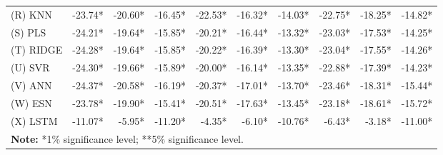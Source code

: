 {\begin{longtable}[htb!]{lrrrrrrrrr}
(R) KNN             & -23.74* & -20.60* & -16.45*  & -22.53* & -16.32* & -14.03* & -22.75* & -18.25* & -14.82* \\
(S) PLS             & -24.21* & -19.64* & -15.85*  & -20.21* & -16.44* & -13.32* & -23.03* & -17.53* & -14.25* \\
(T) RIDGE           & -24.28* & -19.64* & -15.85*  & -20.22* & -16.39* & -13.30* & -23.04* & -17.55* & -14.26* \\
(U) SVR             & -24.30* & -19.66* & -15.89*  & -20.00* & -16.14* & -13.35* & -22.88* & -17.39* & -14.23* \\
(V) ANN             & -24.37* & -20.58* & -16.19*  & -20.37* & -17.01* & -13.70* & -23.46* & -18.31* & -15.44* \\
(W) ESN             & -23.78* & -19.90* & -15.41*  & -20.51* & -17.63* & -13.45* & -23.18* & -18.61* & -15.72* \\
(X) LSTM            & -11.07* & -5.95* & -11.20* & -4.35* & -6.10* & -10.76* & -6.43* & -3.18* & -11.00* \\ \hline
\multicolumn{10}{l}{\textbf{Note:} *1\% significance level; **5\% significance level.}
\end{longtable}
}